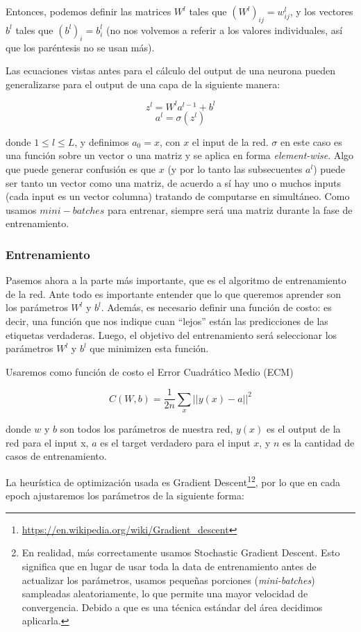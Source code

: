 Entonces, podemos definir las matrices $W^l$ tales que $(W^l)_{ij} = w^l_{ij}$, y los vectores $b^l$ tales que $(b^l)_i = b^l_i$ (no nos volvemos a referir a los valores individuales, así que los paréntesis no se usan más).

Las ecuaciones vistas antes para el cálculo del output de una neurona pueden generalizarse para el output de una capa de la siguiente manera:

$$z^l = W^l a^{l-1} + b^l$$
$$a^l = \sigma (z^l)$$

donde $1\leq l\leq L$, y definimos $a_0 = x$, con $x$ el input de la red. $\sigma$ en este caso es una función sobre un vector o una matriz y se aplica en forma \emph{element-wise}. Algo que puede generar confusión es que $x$ (y por lo tanto las subsecuentes $a^l$) puede ser tanto un vector como una matriz, de acuerdo a sí hay uno o muchos inputs (cada input es un vector columna) tratando de computarse en simultáneo. Como usamos $mini-batches$ para entrenar, siempre será una matriz durante la fase de entrenamiento.

\subsubsection{Entrenamiento}

Pasemos ahora a la parte más importante, que es el algoritmo de entrenamiento de la red. Ante todo es importante entender que lo que queremos aprender son los parámetros $W^l$ y $b^l$. Además, es necesario definir una función de costo: es decir, una función que nos indique cuan ``lejos'' están las predicciones de las etiquetas verdaderas. Luego, el objetivo del entrenamiento será seleccionar los parámetros $W^l$ y $b^l$ que minimizen esta función.

Usaremos como función de costo el Error Cuadrático Medio (ECM)

$$C(W, b) = \frac{1}{2n}\sum_{x}{||y(x) - a||^2}$$

donde $w$ y $b$ son todos los parámetros de nuestra red, $y(x)$ es el output de la red para el input x, $a$ es el target verdadero para el input $x$, y $n$ es la cantidad de casos de entrenamiento.

La heurística de optimización usada es Gradient Descent\footnote{\url{https://en.wikipedia.org/wiki/Gradient_descent}}\footnote{En realidad, más correctamente usamos Stochastic Gradient Descent. Esto significa que en lugar de usar toda la data de entrenamiento antes de actualizar los parámetros, usamos pequeñas porciones  (\emph{mini-batches}) sampleadas aleatoriamente, lo que permite una mayor velocidad de convergencia. Debido a que es una técnica estándar del área decidimos aplicarla.}, por lo que en cada epoch ajustaremos los parámetros de la siguiente forma:

